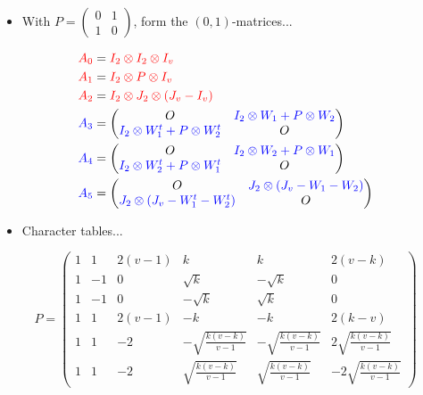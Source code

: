 \documentclass{beamer}
\newcommand{\rred}[1]{\textcolor{red}{#1}}
\newcommand{\bblue}[1]{\textcolor{blue}{#1}}
\begin{document}
\begin{frame}

  \begin{itemize}
  \item With $P=\left( \begin{smallmatrix} 0&1\\1&0 \end{smallmatrix}
    \right)$, form the $(0,1)$-matrices...
  \end{itemize}

  \[
    \begin{align*}
      \rred{A_0} &= \rred{I_2 \otimes I_2 \otimes I_v} \\
      \rred{A_1} &= \rred{I_2 \otimes P \otimes I_v} \\
      \rred{A_2} &= \rred{I_2 \otimes J_2 \otimes (J_v - I_v)} \\
      \bblue{A_3} &= \begin{pmatrix}
               O & \bblue{I_2 \otimes W_1 + P \otimes W_2} \\
               \bblue{I_2 \otimes W_1^t + P \otimes W_2^t} & O
             \end{pmatrix} \\
      \bblue{A_4} &= \begin{pmatrix}
               O & \bblue{I_2 \otimes W_2 + P \otimes W_1} \\
               \bblue{I_2 \otimes W_2^t + P \otimes W_1^t} & O              
             \end{pmatrix} \\
      \bblue{A_5} &= \begin{pmatrix}
               O & \bblue{J_2 \otimes (J_v - W_1 - W_2)} \\
               \bblue{J_2 \otimes (J_v - W_1^t - W_2^t)} & O
             \end{pmatrix}
    \end{align*}
  \]
  
\end{frame}

\begin{frame}

  \begin{itemize}
  \item Character tables...
  \end{itemize}

  \[
    P = \begin{pmatrix}
          1 & 1 & 2(v-1) & k & k & 2(v-k) \\
          1 & -1 & 0 & \sqrt{k} & -\sqrt{k} & 0 \\
          1 & -1 & 0 & -\sqrt{k} & \sqrt{k} & 0 \\
          1 & 1 & 2(v-1) & -k & -k & 2(k-v) \\
          1 & 1 & -2 & -\sqrt{\frac{k(v-k)}{v-1}} & -\sqrt{\frac{k(v-k)}{v-1}} & 2\sqrt{\frac{k(v-k)}{v-1}} \\
          1 & 1 & -2 & \sqrt{\frac{k(v-k)}{v-1}} & \sqrt{\frac{k(v-k)}{v-1}} & -2\sqrt{\frac{k(v-k)}{v-1}}
        \end{pmatrix}
  \]
  
\end{frame}
\end{document}
